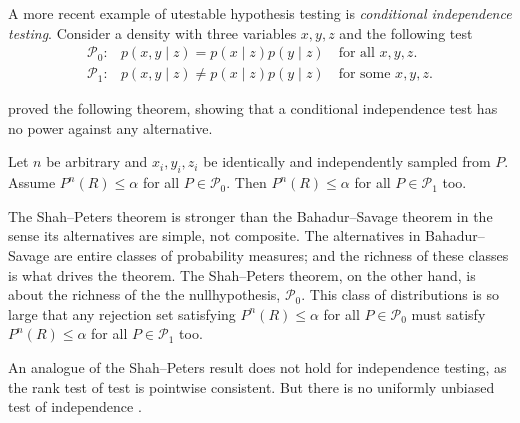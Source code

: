 A more recent example of utestable hypothesis testing is \emph{conditional
independence testing}. Consider a density with three variables $x,y,z$
and the following test
\begin{align*}
\mathcal{P}_{0}: & p(x,y\mid z)=p(x\mid z)p(y\mid z)\quad\textrm{for all }x,y,z.\\
\mathcal{P}_{1}: & p(x,y\mid z)\neq p(x\mid z)p(y\mid z)\quad\textrm{for some }x,y,z.
\end{align*}

\textcite{Shah2018-jh} proved the following theorem, showing that a
conditional independence test has no power against any alternative. 
\begin{theorem}
\label{theorem:Shah--Peters}Let $n$ be arbitrary and $x_{i},y_{i},z_{i}$
be identically and independently sampled from $P$. Assume $P^{n}(R)\leq\alpha$
for all $P\in\mathcal{P}_{0}$. Then $P^{n}(R)\leq\alpha$ for all
$P\in\mathcal{P}_{1}$ too.
\end{theorem}

The Shah--Peters theorem is stronger than the Bahadur--Savage theorem
in the sense its alternatives are simple, not composite. The alternatives
in Bahadur--Savage are entire classes of probability measures; and
the richness of these classes is what drives the theorem. The Shah--Peters
theorem, on the other hand, is about the richness of the the nullhypothesis,
$\mathcal{P}_{0}$. This class of distributions is so large that any
rejection set satisfying $P^{n}(R)\leq\alpha$ for all $P\in\mathcal{P}_{0}$
must satisfy $P^{n}(R)\leq\alpha$ for all $P\in\mathcal{P}_{1}$
too.

An analogue of the Shah--Peters result does not hold for independence
testing, as the rank test of \textcite{Hoeffding1948-nm} test is pointwise
consistent. But there is no uniformly unbiased test of independence
.
